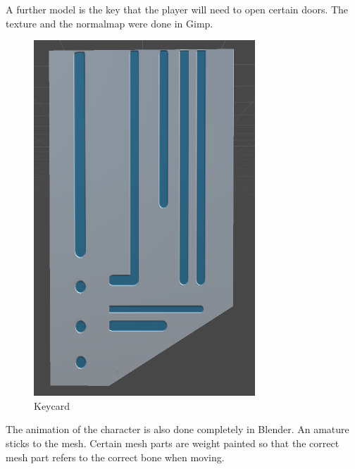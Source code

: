 \documentclass[12pt, letterpaper]{scrartcl}
\begin{document}
	A further model is the key that the player will need to open certain doors. The texture and the normalmap were done in Gimp.
	\begin{figure}[H]
		\centering
		\includegraphics[scale=.4]{images//alpha/keycardModel}
		\caption{Keycard}
	\end{figure}
	The animation of the character is also done completely in Blender. An amature sticks to the mesh. Certain mesh parts are weight painted so that the correct mesh part refers to the correct bone when moving.
\end{document}
